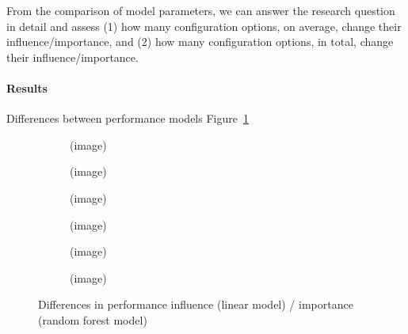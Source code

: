 From the comparison of model parameters, we can answer the research question in detail and assess (1) how many configuration options, on average, change their influence/importance, and (2) how many configuration options, in total, change their influence/importance.

\paragraph*{Results} {\color{blue} Differences between performance models Figure~\ref{fig:diff_performance_influences}}\\

\begin{figure}
	\centering
	\begin{subfigure}{0.33\textwidth}
		\centering
		(image)
		\caption{\batik}
	\end{subfigure}
	\begin{subfigure}{0.33\textwidth}
		\centering
		(image)
		\caption{\dconvert}
	\end{subfigure}
	\begin{subfigure}{0.33\textwidth}
		\centering
		(image)
		\caption{\htwo}
	\end{subfigure}
	\begin{subfigure}{0.33\textwidth}
		\centering
		(image)
		\caption{\jumper}
	\end{subfigure}
	\begin{subfigure}{0.33\textwidth}
		\centering
		(image)
		\caption{\jadx}
	\end{subfigure}
	\begin{subfigure}{0.33\textwidth}
		\centering
		(image)
		\caption{\kanzi}
	\end{subfigure}
	\caption{Differences in performance influence (linear model) / importance (random forest model)}
	\label{fig:diff_performance_influences}
\end{figure}


